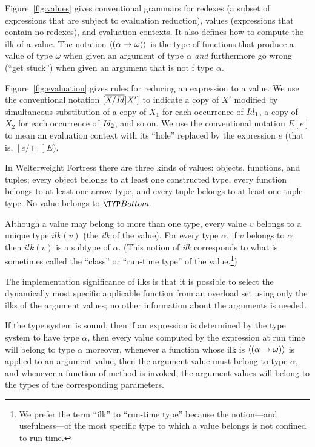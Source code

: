 

Figure~\ref{fig:values} gives conventional grammars for redexes (a subset of expressions that are subject to evaluation reduction),
values (expressions that contain no redexes), and evaluation contexts.  It also defines how to compute the ilk of a value.
The notation $\langle{\mbox{\ensuremath{({\alpha} \rightarrow {\omega})}}}\rangle$ is the type of functions that produce a value of type $\omega$ when
given an argument of type $\alpha$ \emph{and} furthermore go wrong (``get stuck'') when given an argument that is not
f type $\alpha$.



Figure~\ref{fig:evaluation} gives rules for reducing an expression to a value.
We use the conventional notation $[\overline{X/\mathit{Id}}]X']$ to indicate a copy of $X'$
modified by simultaneous substitution of a copy of $X_1$ for each occurrence of $\mathit{Id}_1$,
a copy of $X_2$ for each occurrence of $\mathit{Id}_2$, and so on.
We use the conventional notation $E[e]$ to mean an evaluation context with its ``hole''
replaced by the expression $e$ (that is, $[e/\Box]E$).



In Welterweight Fortress there are three kinds of values: 
objects, functions, and tuples;
every object belongs to at least one constructed type,
every function belongs to at least one arrow type,
and every tuple belongs to at least one tuple type.
No value belongs to $\Bottom$.

Although a value may belong to more than one type, 
every value $v$ belongs to a unique type $\mathit{ilk}(v)$
(the \emph{ilk} of the value).
For every type $\alpha$,
if $v$ belongs to $\alpha$ then $\mathit{ilk}(v)$ is a subtype of $\alpha$.
(This notion of \emph{ilk} corresponds to what is sometimes called the
``class'' or ``run-time type'' of the value.\footnote{%
We prefer the term ``ilk'' to ``run-time type'' 
because the notion---and usefulness---of 
the most specific type to which a value belongs 
is not confined to run time.})

The implementation significance of ilks is that it is possible to
select the dynamically most specific applicable function
from an overload set using only the ilks of the argument values; no
other information about the arguments is needed.

If the type system is sound, then
if an expression is determined by the type system to have type $\alpha$,
then every value computed by the expression at run time
will belong to type $\alpha$
moreover, 
whenever a function whose ilk is $\langle{\mbox{\ensuremath{({\alpha} \rightarrow {\omega})}}}\rangle$ is applied to an argument value,
then the argument value must belong to type $\alpha$, and whenever a function of method is invoked,
the argument values will belong to the types of the corresponding parameters.

\clearpage
